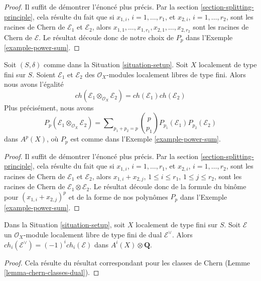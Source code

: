 \begin{proof}
Il suffit de démontrer l'énoncé plus précis. Par la
section \ref{section-splitting-principle},
cela résulte du fait que si $x_{1, i}$, $i = 1, \ldots, r_1$,
et $x_{2, i}$, $i = 1, \ldots, r_2$, sont les
racines de Chern de $\mathcal{E}_1$ et $\mathcal{E}_2$, alors
$x_{1, 1}, \ldots, x_{1, r_1}, x_{2, 1}, \ldots, x_{2, r_2}$
sont les racines de Chern de $\mathcal{E}$. Le résultat découle donc
de notre choix de $P_p$ dans l'Exemple \ref{example-power-sum}.
\end{proof}

\begin{lemma}
\label{lemma-chern-character-multiplicative}
Soit $(S, \delta)$ comme dans la Situation \ref{situation-setup}. Soit $X$ localement
de type fini sur $S$. Soient $\mathcal{E}_1$ et $\mathcal{E}_2$
des $\mathcal{O}_X$-modules localement libres de type fini.
Alors nous avons l'égalité
$$
ch(\mathcal{E}_1 \otimes_{\mathcal{O}_X} \mathcal{E}_2) =
ch(\mathcal{E}_1) ch(\mathcal{E}_2)
$$
Plus précisément, nous avons
$$
P_p(\mathcal{E}_1 \otimes_{\mathcal{O}_X} \mathcal{E}_2) =
\sum\nolimits_{p_1 + p_2 = p}
{p \choose p_1} P_{p_1}(\mathcal{E}_1) P_{p_2}(\mathcal{E}_2)
$$
dans $A^p(X)$, où $P_p$ est comme dans l'Exemple \ref{example-power-sum}.
\end{lemma}

\begin{proof}
Il suffit de démontrer l'énoncé plus précis. Par la
section \ref{section-splitting-principle},
cela résulte du fait que si $x_{1, i}$, $i = 1, \ldots, r_1$,
et $x_{2, i}$, $i = 1, \ldots, r_2$, sont les
racines de Chern de $\mathcal{E}_1$ et $\mathcal{E}_2$, alors
$x_{1, i} + x_{2, j}$, $1 \leq i \leq r_1$, $1 \leq j \leq r_2$,
sont les racines de Chern de $\mathcal{E}_1 \otimes \mathcal{E}_2$.
Le résultat découle donc de la formule du binôme pour
$(x_{1, i} + x_{2, j})^p$ et de la
forme de nos polynômes $P_p$ dans l'Exemple \ref{example-power-sum}.
\end{proof}

\begin{lemma}
\label{lemma-chern-character-dual}
Dans la Situation \ref{situation-setup}, soit $X$ localement de type fini sur $S$.
Soit $\mathcal{E}$ un $\mathcal{O}_X$-module localement libre de type fini
de dual $\mathcal{E}^\vee$. Alors
$ch_i(\mathcal{E}^\vee) = (-1)^i ch_i(\mathcal{E})$ dans
$A^i(X) \otimes \mathbf{Q}$.
\end{lemma}

\begin{proof}
Cela résulte du résultat correspondant pour les classes de Chern
(Lemme \ref{lemma-chern-classes-dual}).
\end{proof}











